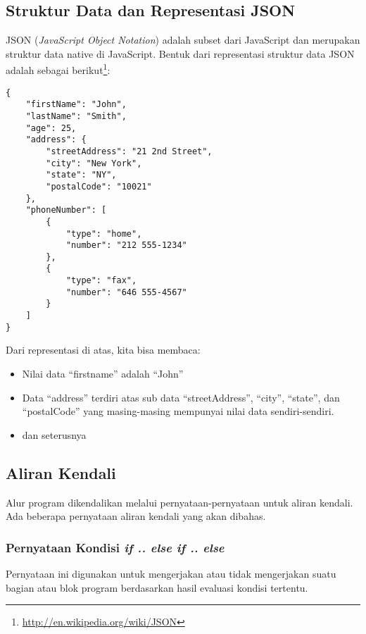 \subsection{Struktur Data dan Representasi JSON}

JSON (\textit{JavaScript Object Notation}) adalah subset dari JavaScript dan merupakan struktur data native di JavaScript. Bentuk dari representasi struktur data JSON adalah sebagai berikut\footnote{\url{http://en.wikipedia.org/wiki/JSON}}:

\begin{lstlisting}
{
    "firstName": "John",
    "lastName": "Smith",
    "age": 25,
    "address": {
        "streetAddress": "21 2nd Street",
        "city": "New York",
        "state": "NY",
        "postalCode": "10021"
    },
    "phoneNumber": [
        {
            "type": "home",
            "number": "212 555-1234"
        },
        {
            "type": "fax",
            "number": "646 555-4567"
        }
    ]
}
\end{lstlisting}

Dari representasi di atas, kita bisa membaca:
\begin{itemize}
  \item Nilai data ``firstname'' adalah ``John''
  \item Data ``address'' terdiri atas sub data ``streetAddress'', ``city'', ``state'', dan ``postalCode'' yang masing-masing mempunyai nilai data sendiri-sendiri.
  \item dan seterusnya
\end{itemize}

\subsection{Aliran Kendali}

Alur program dikendalikan melalui pernyataan-pernyataan untuk aliran kendali. Ada beberapa pernyataan aliran kendali yang akan dibahas.

\subsubsection{Pernyataan Kondisi \textit{if .. else if .. else}}

Pernyataan ini digunakan untuk mengerjakan atau tidak mengerjakan suatu bagian atau blok program berdasarkan hasil evaluasi kondisi tertentu.

